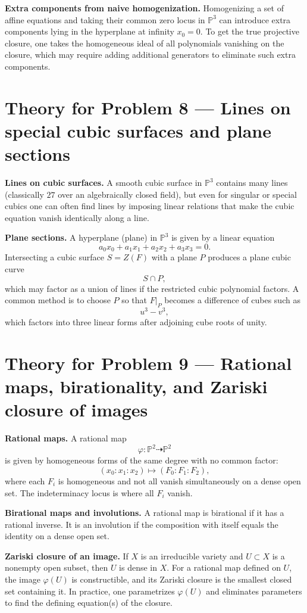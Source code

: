\documentclass[12pt,a4paper]{article}
\theoremstyle{plain}
\theoremstyle{definition}      %
\begin{document}
\textbf{Extra components from naive homogenization.}
Homogenizing a set of affine equations and taking their common zero locus in $\mathbb{P}^3$ can introduce extra components lying in the hyperplane at infinity $x_0=0$.
To get the true projective closure, one takes the homogeneous ideal of all polynomials vanishing on the closure, which may require adding additional generators to eliminate such extra components.


\section*{Theory for Problem 8 — Lines on special cubic surfaces and plane sections}

\textbf{Lines on cubic surfaces.}
A smooth cubic surface in $\mathbb{P}^3$ contains many lines (classically $27$ over an algebraically closed field), but even for singular or special cubics one can often find lines by imposing linear relations that make the cubic equation vanish identically along a line.

\textbf{Plane sections.}
A hyperplane (plane) in $\mathbb{P}^3$ is given by a linear equation
\[
a_0x_0+a_1x_1+a_2x_2+a_3x_3=0.
\]
Intersecting a cubic surface $S=Z(F)$ with a plane $P$ produces a plane cubic curve
\[
S\cap P,
\]
which may factor as a union of lines if the restricted cubic polynomial factors.
A common method is to choose $P$ so that $F|_P$ becomes a difference of cubes such as
\[
u^3-v^3,
\]
which factors into three linear forms after adjoining cube roots of unity.


\section*{Theory for Problem 9 — Rational maps, birationality, and Zariski closure of images}

\textbf{Rational maps.}
A rational map
\[
\varphi:\mathbb{P}^2\dashrightarrow \mathbb{P}^2
\]
is given by homogeneous forms of the same degree with no common factor:
\[
(x_0:x_1:x_2)\mapsto (F_0:F_1:F_2),
\]
where each $F_i$ is homogeneous and not all vanish simultaneously on a dense open set.
The indeterminacy locus is where all $F_i$ vanish.

\textbf{Birational maps and involutions.}
A rational map is birational if it has a rational inverse.
It is an involution if the composition with itself equals the identity on a dense open set.

\textbf{Zariski closure of an image.}
If $X$ is an irreducible variety and $U\subset X$ is a nonempty open subset, then $U$ is dense in $X$.
For a rational map defined on $U$, the image $\varphi(U)$ is constructible, and its Zariski closure is the smallest closed set containing it.
In practice, one parametrizes $\varphi(U)$ and eliminates parameters to find the defining equation(s) of the closure.
\end{document}
